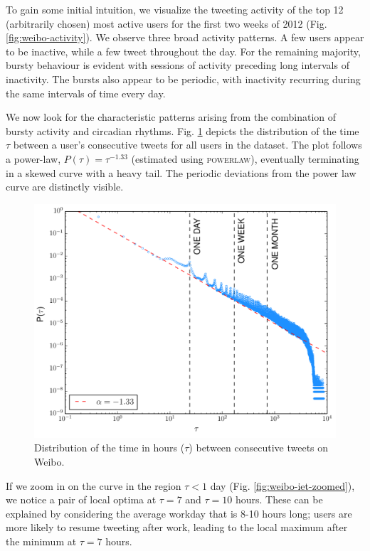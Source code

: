 \documentclass[onesided,letterpaper]{tufte-book}
\begin{document}
To gain some initial intuition, we visualize the tweeting activity of the top 12 (arbitrarily chosen) most active users for the first two weeks of 2012 (Fig. \ref{fig:weibo-activity}). We observe three broad activity patterns. A few users appear to be inactive, while a few tweet throughout the day. For the remaining majority, bursty behaviour is evident with sessions of activity preceding long intervals of inactivity. The bursts also appear to be periodic, with inactivity recurring during the same intervals of time every day.

We now look for the characteristic patterns arising from the combination of bursty activity and circadian rhythms. Fig. \ref{fig:weibo-iet} depicts the distribution of the time $\tau$ between a user's consecutive tweets for all users in the dataset. The plot follows a power-law, $P(\tau) = \tau^{-1.33}$ (estimated using \textsc{powerlaw}\cite{alstott2014powerlaw}), eventually terminating in a skewed curve with a heavy tail. The periodic deviations from the power law curve are distinctly visible.

\begin{figure}
  \includegraphics[width=\linewidth]{weibo_iet}
  \caption[Weibo intertweet time distribution.]{Distribution of the time in hours ($\tau$) between consecutive tweets on Weibo.}
  \label{fig:weibo-iet}
\end{figure}

\newpage

If we zoom in on the curve in the region $\tau < 1$ day (Fig. \ref{fig:weibo-iet-zoomed}), we notice a pair of local optima at $\tau = 7$ and $\tau = 10$ hours. These can be explained by considering the average workday that is 8-10 hours long; users are more likely to resume tweeting after work, leading to the local maximum after the minimum at $\tau = 7$ hours.
\end{document}
